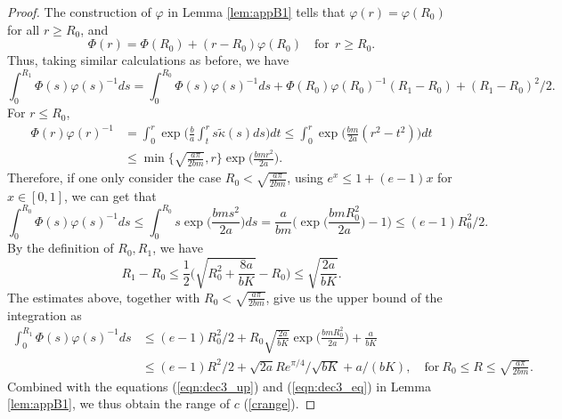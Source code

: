 \documentclass[11pt]{article}
\newcommand{\1}{\mathds{1}}
\begin{document}
\begin{proof}
    The construction of $\varphi$ in Lemma \ref{lem:appB1} tells that $\varphi(r)= \varphi(R_0)$ for all $r\geq R_0$, and 
    \begin{equation}
        \Phi(r) = \Phi(R_0) + (r-R_0) \varphi(R_0) \quad \text{for}~~r\geq R_0.
    \end{equation}
    Thus, taking similar calculations as before, we have
    \begin{equation}
        \int_0^{R_1} \Phi(s) \varphi(s)^{-1} ds = \int_0^{R_0} \Phi(s) \varphi(s)^{-1} ds + \Phi(R_0)\varphi(R_0)^{-1}(R_1-R_0) + (R_1-R_0)^2/2.
    \end{equation}
For $r\leq R_0$,
\begin{equation}
\begin{aligned}
    \Phi(r) \varphi(r)^{-1} &= \int_0^r\exp\Big(\frac{b}{a}\int_t^r s\tilde{\kappa}(s)ds\Big)dt  \leq \int_0^r\exp\Big(\frac{bm}{2a}(r^2-t^2)\Big)dt \\
    &\leq \min\Big\{\sqrt{\frac{a\pi}{2bm}}, r\Big\} \exp\Big(\frac{bm r^2}{2a}\Big).
    \end{aligned}
\end{equation}
Therefore, if one only consider the case $R_0< \sqrt{\frac{a\pi}{2bm}}$, using $e^x \leq 1+(e-1)x$ for $x\in[0,1]$, we can get that
\begin{equation}
    \int_0^{R_0} \Phi(s) \varphi(s)^{-1} ds \leq \int_0^{R_0} s \exp\Big(\frac{bms^2}{2a}\Big) ds = \frac{a}{bm}\Big(\exp\big(\frac{bm R_0^2}{2a}\big)-1\Big)\leq (e-1)R_0^2/2.
\end{equation}
By the definition of $R_0, R_1$, we have 
\begin{equation}
    R_1-R_0 \leq  \frac{1}{2}\Big(\sqrt{R_0^2+\frac{8a}{bK}}-R_0\Big)\leq \sqrt{\frac{2a}{b K}}.
\end{equation}
The estimates above, together with $R_0< \sqrt{\frac{a\pi}{2bm}}$, give us the upper bound of the integration as 
\begin{equation}
\begin{aligned}
     \int_0^{R_1} \Phi(s) \varphi(s)^{-1} ds &\leq (e-1)R_0^2/2 + R_0\sqrt{\frac{2a}{b K}}\exp\Big(\frac{bm R_0^2}{2a}\Big)+ \frac{a}{bK}\\
     &\leq (e-1)R^2/2 + \sqrt{2a}Re^{\pi/4}/\sqrt{bK}+ a/(bK), \quad \text{for}~R_0\leq R\leq \sqrt{\frac{a\pi}{2bm}}.
\end{aligned}
\end{equation}
Combined with the equations (\ref{eqn:dec3_up}) and (\ref{eqn:dec3_eq}) in Lemma \ref{lem:appB1}, we thus obtain the range of $c$ (\ref{crange}).
\end{proof}
\end{document}
